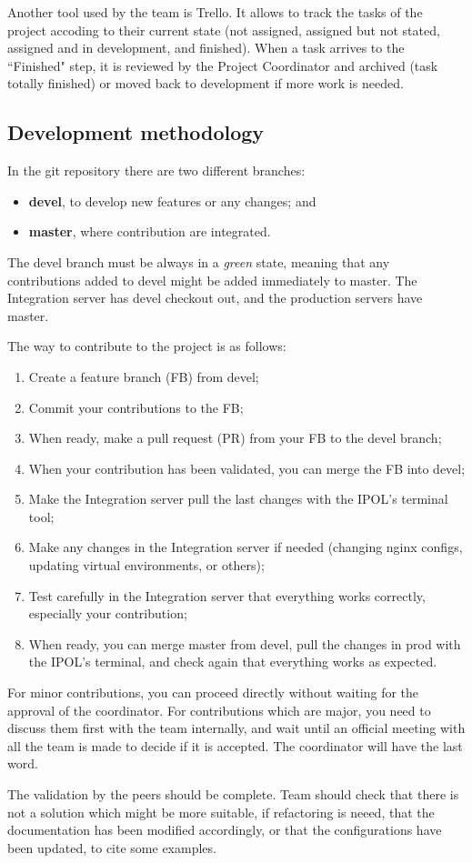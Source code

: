 Another tool used by the team is Trello. It allows to track the tasks of the project accoding to their current state (not assigned, assigned but not stated, assigned and in development, and finished). When a task arrives to the ``Finished" step, it is reviewed by the Project Coordinator and archived (task totally finished) or moved back to development if more work is needed.

\subsection{Development methodology}
In the git repository there are two different branches:
\begin{itemize}
	\item \textbf{devel}, to develop new features or any changes; and
	\item \textbf{master}, where contribution are integrated.
\end{itemize}

The devel branch must be always in a \emph{green} state, meaning that any contributions added to devel might be added immediately to master. The Integration server has devel checkout out, and the production servers have master.

The way to contribute to the project is as follows:
\begin{enumerate}
	\item Create a feature branch (FB) from devel;
	\item Commit your contributions to the FB;
	\item When ready, make a pull request (PR) from your FB to the devel branch;
	\item When your contribution has been validated, you can merge the FB into devel;
	\item Make the Integration server pull the last changes with the IPOL's terminal tool;
	\item Make any changes in the Integration server if needed (changing nginx configs, updating virtual environments, or others);
	\item Test carefully in the Integration server that everything works correctly, especially your contribution;
	\item When ready, you can merge master from devel, pull the changes in prod with the IPOL's terminal, and check again that everything works as expected.
\end{enumerate}

For minor contributions, you can proceed directly without waiting for the approval of the coordinator.
For contributions which are major, you need to discuss them first with the team internally, and wait until an official meeting with all the team is made to decide if it is accepted. The coordinator will have the last word.

The validation by the peers should be complete. Team should check that there is not a solution which might be more suitable, if refactoring is neeed, that the documentation has been modified accordingly, or that the configurations have been updated, to cite some examples.
